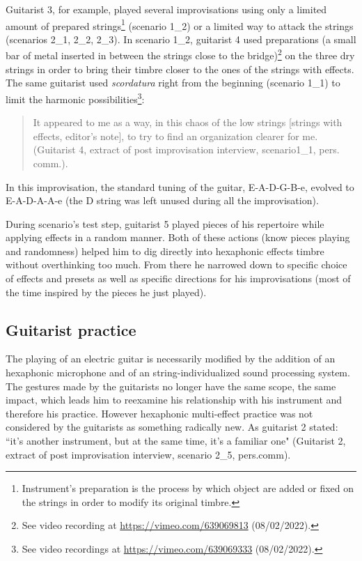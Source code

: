 \documentclass{article}
\begin{document}
Guitarist 3, for example, played several improvisations using only a limited amount of prepared strings\footnote{Instrument's preparation is the process by which object are added or fixed on the strings in order to modify its original timbre.} (scenario 1\_2) or a limited way to attack the strings (scenarios 2\_1, 2\_2, 2\_3). In scenario 1\_2, guitarist 4 used preparations (a small bar of metal inserted in between the strings close to the bridge)\footnote{See video recording at \url{https://vimeo.com/639069813} (08/02/2022).} on the three dry strings in order to bring their timbre closer to the ones of the strings with effects. The same guitarist used \textit{scordatura} right from the beginning (scenario 1\_1) to limit the harmonic possibilities\footnote{See video recordings at \url{https://vimeo.com/639069333} (08/02/2022).}:
    \begin{quote}
     It appeared to me as a way, in this chaos of the low strings [strings with effects, editor's note], to try to find an organization clearer for me. (Guitarist 4, extract of post improvisation interview, scenario1\_1, pers. comm.).
    \end{quote}
In this improvisation, the standard tuning of the guitar, E-A-D-G-B-e, evolved to E-A-D-A-A-e (the D string was left unused during all the improvisation). 

During scenario's test step, guitarist 5 played pieces of his repertoire while applying effects in a random manner. Both of these actions (know pieces playing and randomness) helped him to dig directly into hexaphonic effects timbre without overthinking too much. From there he narrowed down to specific choice of effects and presets as well as specific directions for his improvisations (most of the time inspired by the pieces he just played). 

\subsection{Guitarist practice}
The playing of an electric guitar is necessarily modified by the addition of an hexaphonic microphone and of an string-individualized sound processing system. The gestures made by the guitarists no longer have the same scope, the same impact, which leads him to reexamine his relationship with his instrument and therefore his practice.
However hexaphonic multi-effect practice was not considered by the guitarists as something radically new.  As guitarist 2 stated: ``it's another instrument, but at the same time, it's a familiar one" (Guitarist 2, extract of post improvisation interview,  scenario 2\_5, pers.comm). 
\end{document}
